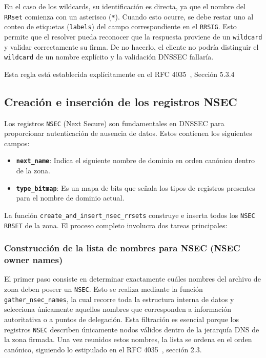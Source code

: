 En el caso de los wildcards, su identificación es directa, ya que el nombre del \texttt{RRset} comienza con un asterisco (\texttt{*}).
Cuando esto ocurre, se debe restar uno al conteo de etiquetas (\texttt{labels}) del campo correspondiente en el \texttt{RRSIG}.
Esto permite que el resolver pueda reconocer que la respuesta proviene de un \texttt{wildcard} y validar correctamente su firma.
De no hacerlo, el cliente no podría distinguir el \texttt{wildcard} de un nombre explícito y la validación DNSSEC fallaría.

Esta regla está establecida explícitamente en el RFC 4035~\cite{RFC4035}, Sección 5.3.4

\subsection{Creación e inserción de los registros NSEC}

Los registros \texttt{NSEC} (Next Secure) son fundamentales en DNSSEC para proporcionar autenticación de ausencia de datos.
Estos contienen los siguientes campos:

\begin{itemize}
    \item \textbf{\texttt{next\_name}}: Indica el siguiente nombre de dominio en orden canónico dentro de la zona.
    \item \textbf{\texttt{type\_bitmap}}: Es un mapa de bits que señala los tipos de registros presentes para el nombre de dominio actual.
\end{itemize}

La función \texttt{create\_and\_insert\_nsec\_rrsets} construye e inserta todos los \texttt{NSEC RRSET} de la zona. El proceso completo involucra dos tareas principales:

\subsubsection{Construcción de la lista de nombres para NSEC (NSEC owner names)}

El primer paso consiste en determinar exactamente cuáles nombres del archivo de zona deben poseer un \texttt{NSEC}. Esto se realiza mediante la función \texttt{gather\_nsec\_names}, 
la cual recorre toda la estructura interna de datos y selecciona únicamente aquellos nombres que corresponden a información autoritativa o a puntos de delegación. 
Esta filtración es esencial porque los registros \texttt{NSEC} describen únicamente nodos válidos dentro de la jerarquía DNS de la zona firmada. Una vez reunidos estos nombres, 
la lista se ordena en el orden canónico, siguiendo lo estipulado en el RFC 4035~\cite{RFC4035}, sección 2.3.

